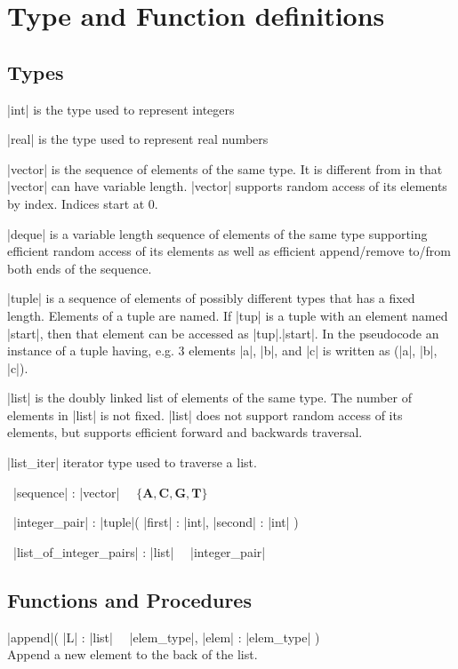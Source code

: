 \documentclass{article}
\newcommand{\OF}{\ \keyword{of}\ }
\newcommand{\TYPE}{\keyword{type}\ }
\begin{document}
\section{Type and Function definitions}\label{secpseudo}

\subsection{Types}

|int| is the type used to represent integers

|real| is the type used to represent real numbers

|vector| is the sequence of elements of the same type. It is different from
\ARRAY in that |vector| can have variable length. |vector| supports random
access of its elements by index. Indices start at $0$.

|deque| is a variable length sequence of elements of the same type supporting
efficient random access of its elements as well as efficient append/remove to/from
both ends of the sequence.

|tuple| is a sequence of elements of possibly different types that has a fixed
length. Elements of a tuple are named. If |tup| is a tuple with an element named
|start|, then that element can be accessed as |tup|.|start|. In the pseudocode
an instance of a tuple having, e.g. 3 elements |a|, |b|, and |c| is written
as (|a|, |b|, |c|).

|list| is the doubly linked list of elements of the same type. The number of
elements in |list| is not fixed. |list| does not support random access of its
elements, but supports efficient forward and backwards traversal.

|list_iter| iterator type used to traverse a list.

\TYPE |sequence| : |vector| \OF $\{ \mathbf{A}, \mathbf{C}, \mathbf{G}, \mathbf{T} \}$

\TYPE |integer_pair| : |tuple|( |first| : |int|, |second| : |int| )

\TYPE |list_of_integer_pairs| : |list| \OF |integer_pair|

\subsection{Functions and Procedures}

\PROC |append|( |L| : |list| \OF |elem_type|, |elem| : |elem_type| ) \ENDPROC \\
Append a new element to the back of the list.
\end{document}
